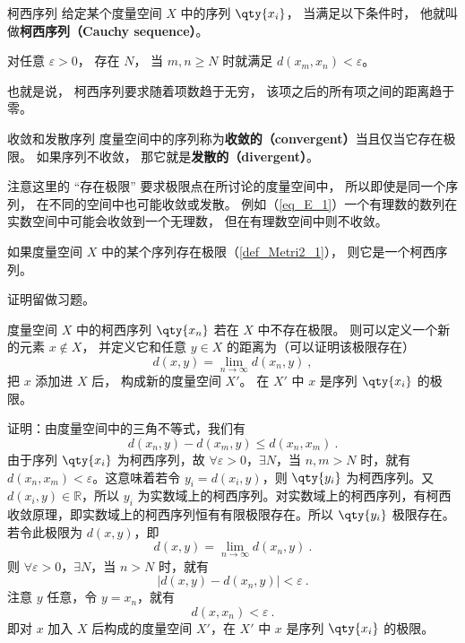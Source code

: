 

\begin{definition}{柯西序列}\label{def_cauchy_3}
给定某个度量空间 $X$ 中的序列 $\qty{x_i}$， 当满足以下条件时， 他就叫做\textbf{柯西序列（Cauchy sequence）}。

对任意 $\varepsilon > 0$， 存在 $N$， 当 $m, n \geqslant N$ 时就满足 $d(x_m, x_n) < \varepsilon$。
\end{definition}
也就是说， 柯西序列要求随着项数趋于无穷， 该项之后的所有项之间的距离趋于零。

\begin{definition}{收敛和发散序列}\label{def_cauchy_1}
度量空间中的序列称为\textbf{收敛的（convergent）}当且仅当它存在极限。 如果序列不收敛， 那它就是\textbf{发散的（divergent）}。
\end{definition}
注意这里的 “存在极限” 要求极限点在所讨论的度量空间中， 所以即使是同一个序列， 在不同的空间中也可能收敛或发散。 例如（\autoref{eq_E_1}）一个有理数的数列在实数空间中可能会收敛到一个无理数， 但在有理数空间中则不收敛。

\begin{theorem}{}\label{the_cauchy_2}
如果度量空间 $X$ 中的某个序列存在极限（\autoref{def_Metri2_1}）， 则它是一个柯西序列。
\end{theorem}
证明留做习题。

\begin{theorem}{}\label{the_cauchy_1}
度量空间 $X$ 中的柯西序列 $\qty{x_n}$ 若在 $X$ 中不存在极限。 则可以定义一个新的元素 $x \notin X$， 并定义它和任意 $y\in X$ 的距离为（可以证明该极限存在）
\begin{equation}
d(x, y) = \lim_{n\to\infty} d(x_n, y)~,
\end{equation}
把 $x$ 添加进 $X$ 后， 构成新的度量空间 $X'$。 在 $X'$ 中 $x$ 是序列 $\qty{x_i}$ 的极限。
\end{theorem}
证明：由度量空间中的三角不等式，我们有
\begin{equation}
d(x_n,y)-d(x_m,y)\leq d(x_n,x_m)~.
\end{equation}
由于序列 $\qty{x_i}$ 为柯西序列，故 $\forall\varepsilon>0$，$\exists N$，当 $n,m>N$ 时，就有 $d(x_n,x_m)<\varepsilon$。这意味着若令 $y_i=d(x_i,y)$，则 $\qty{y_i}$ 为柯西序列。又 $d(x_i,y)\in \mathbb R$，所以 ${y_i}$ 为实数域上的柯西序列。对实数域上的柯西序列，有柯西收敛原理，即实数域上的柯西序列恒有有限极限存在。所以 $\qty{y_i}$ 极限存在。若令此极限为 $d(x,y)$，即
\begin{equation}
d(x, y) = \lim_{n\to\infty} d(x_n, y)~.
\end{equation}
则 $\forall\varepsilon>0$，$\exists N$，当 $n>N$ 时，就有 
\begin{equation}
|d(x,y)-d(x_n,y)|<\varepsilon~.
\end{equation}
注意 $y$ 任意，令 $y=x_n$，就有
\begin{equation}
d(x,x_n)<\varepsilon~.
\end{equation}
即对 $x$ 加入 $X$ 后构成的度量空间 $X'$，在 $X'$ 中 $x$ 是序列 $\qty{x_i}$ 的极限。

